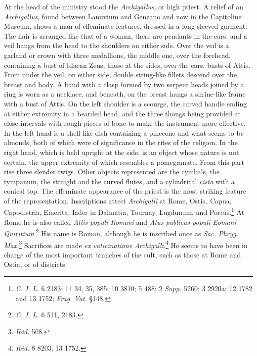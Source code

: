 \documentclass[a4paper, 11pt, oneside, polutonikogreek, english]{article}
\begin{document}
At the head of the ministry stood the \emph{Archigallus}, or high priest. A relief of an \emph{Archigallus}, found between Lanuvium and Genzano and now in the Capitoline Museum, shows a man of effeminate features, dressed in a long-sleeved garment. The hair is arranged like that of a woman, there are pendants in the ears, and a veil hangs from the head to the shoulders on either side. Over the veil is a garland or
crown with three medallions, the middle one, over the forehead, containing a bust of Idaean Zeus, those at the sides, over the ears, busts of Attis. From under the veil, on either side, double string-like fillets descend over the breast and body. A band with a clasp formed by two serpent heads joined by a ring is worn as a necklace, and beneath, on the breast hangs a shrine-like frame with a bust of Attis. On the left shoulder is a scourge, the carved handle ending at either extremity in a bearded head, and the three thongs being provided at close intervals with rough pieces of bone to make the instrument more effective. In the left hand is a shell-like dish containing a pinecone and what seems to be almonds, both of which were of significance in the rites of the religion. In the right hand, which is held upright at the side, is an object whose nature is not certain, the upper extremity of which resembles a pomegranate. From this part rise three slender twigs. Other objects represented are the cymbals, the tympanum, the straight and the curved flutes, and a cylindrical \emph{cista} with a conical top. The effeminate appearance of the priest is the most striking feature of the representation. Inscriptions attest \emph{Archigalli} at Rome, Ostia, Capua, Capodistria, Emerita, Iader in Dalmatia, Tournay, Lugdunum, and Portus.\footnote{\emph{C. I. L.} 6 2183; 14 34, 35, 385; 10 3810; 5 488; 2 \emph{Supp.} 5260; 3 2920a; 12 1782 and 13 1752; \emph{Frag. Vat.} §148.} At Rome he is also called \emph{Attis populi Romani} and \emph{Atus publicus populi Eomani Quiritium}.\footnote{\emph{C. I. L.} 6 511, 2183.} His name is Roman, although he is inscribed once as \emph{Sac. Phryg. Max.}\footnote{\emph{Ibid.} 508.} Sacrifices are made \emph{ex vaticinatione Archigalli}.\footnote{\emph{Ibid.} 8 8203; 13 1752.} He seems to have been in charge of the most important branches of the cult, such as those at Rome and Ostia, or of districts.
\end{document}
